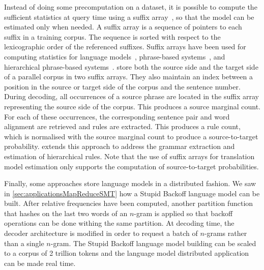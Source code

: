 Instead of doing some precomputation on a dataset, it is possible to compute
the sufficient
statistics at query time using a suffix array~\citep{manber-myers:1990:SIAM}, so
that the model can be estimated only when needed. A suffix array is a sequence of
pointers to each suffix in a training corpus. The sequence is sorted with
respect to the lexicographic order of the referenced suffixes. Suffix arrays
have been used for computing statistics for language
models~\citep{zhang-vogel:2006:techreport}, phrase-based
systems~\citep{callisonburch-bannard-schroeder:2005:ACL,zhang-vogel:2005:EAMT},
and hierarchical phrase-based systems~\citep{lopez:2007:EMNLP-CoNLL}.
\citet{callisonburch-bannard-schroeder:2005:ACL} store both the source side
and the target side of a parallel corpus in two suffix arrays. They also maintain
an index between a position in the source or target side of the corpus and the
sentence number. During decoding, all occurrences of a source phrase
are located in the suffix array representing the source side of the corpus.
This produces a source marginal count. For each of these occurrences, the corresponding
sentence pair and word alignment are retrieved and rules are extracted. This produces
a rule count, which is normalised with the source marginal count to produce a
source-to-target probability. \citet{lopez:2007:EMNLP-CoNLL} extends this approach
to address the grammar extraction and estimation of hierarchical rules.
Note that the use of suffix arrays for translation model estimation only
supports the computation of source-to-target probabilities.



Finally, some approaches store language models in a distributed fashion.
We saw in \autoref{sec:applicationsMapReduceSMT} how a Stupid Backoff language
model can be built. After relative frequencies have been computed, another
partition function that hashes on the last two words of an $n$-gram is applied
so that backoff operations can be done withing the same partition.
At decoding time, the decoder architecture is modified in order
to request a batch of $n$-grams rather than a single $n$-gram.
The Stupid Backoff language model building can be scaled
to a corpus of 2 trillion tokens and the language model distributed
application can be made real time.

